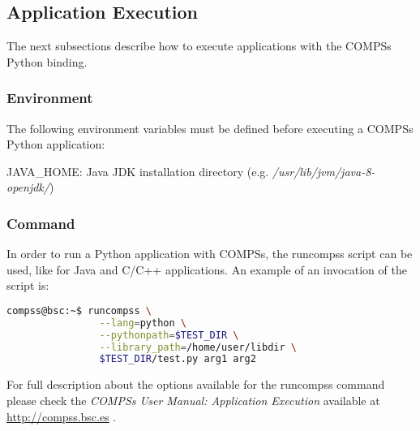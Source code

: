 \subsection{Application Execution}
The next subsections describe how to execute applications with the COMPSs Python binding.

\subsubsection{Environment}
The following environment variables must be defined before executing a COMPSs Python application:

JAVA\_HOME: Java JDK installation directory (e.g. \textit{/usr/lib/jvm/java-8-openjdk/})

\subsubsection{Command}
In order to run a Python application with COMPSs, the runcompss script can be used, like for 
Java and C/C++ applications. An example of an invocation of the script is:

\begin{lstlisting}[language=bash]
compss@bsc:~$ runcompss \
                --lang=python \
                --pythonpath=$TEST_DIR \
                --library_path=/home/user/libdir \
                $TEST_DIR/test.py arg1 arg2
\end{lstlisting}

For full description about the options available for the runcompss command please check the \textit{COMPSs User Manual: Application
Execution} available at \url{http://compss.bsc.es} . 
